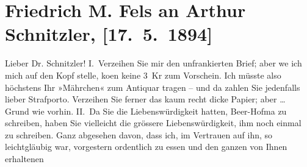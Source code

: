 

         
         \renewcommand{\erwaehntePersonen}{Personen:  ?? [Vermieterin], Richard Beer-Hofmann, Friedrich Michael Fels}
         \renewcommand{\erwaehnteInstitutionen}{Institutionen: Augartenfest}
         \renewcommand{\erwaehnteOrte}{Orte: Krütznergasse, Wien}
         \renewcommand{\erwaehnteWerke}{Werke: Das Märchen. Schauspiel in drei Aufzügen}
               \section[Friedrich M. Fels an Arthur Schnitzler, {[}17. 5. 1894{]}]{ Friedrich M. Fels an Arthur Schnitzler, {[}17. 5. 1894{]}}\nopagebreak{}\rehead{ }\begin{ledgroupsized}[t]{13cm}\normalsize\beginnumbering{} \toendnotes[C]{\smallbreak\pagebreak[2]} 
\toendnotes[C]{\smallbreak}\pstart{}{\pb}Lieber Dr. Schnitzler!\pend\pstart
           I. Verzeihen Sie mir den unfrankierten Brief; aber we{\geminationn}
               ich mich auf den Kopf stelle, ko{\geminationm}en keine 3 Kr zum
               Vorschein. Ich müsste also höchstens Ihr »Mährchen« zum Antiquar tragen – und da zahlen Sie jedenfalls lieber
               Strafporto. Verzeihen Sie ferner das kaum recht dicke Papier; aber {\dots} Grund wie vorhin.\pend
           \pstart
           II. Da Sie die Liebenswürdigkeit hatten, Beer-Hofma{\geminationn} zu schreiben, haben Sie vielleicht die grössere Liebenswürdigkeit, ihm noch
               einmal zu schreiben. Ganz abgesehen davon, dass ich, im Vertrauen auf ihn, so
               leichtgläubig war, vorgestern ordentlich zu essen und den ganzen von Ihnen erhaltenen

\end{ledgroupsized}
